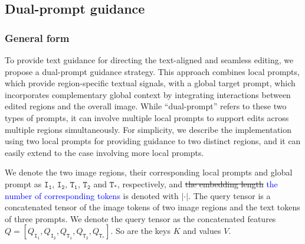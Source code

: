 \documentclass{article}
\newcommand{\kc}[1]{\textcolor{blue}{#1}}
\begin{document}


\subsection{Dual-prompt guidance}
\label{sec:dualprompt}

\subsubsection{General form}
To provide text guidance for directing the text-aligned and seamless editing, we propose a dual-prompt guidance strategy. This approach combines local prompts, which provide region-specific textual signals, with a global target prompt, which incorporates complementary global context by integrating interactions between edited regions and the overall image. While ``dual-prompt'' refers to these two types of prompts, it can involve multiple local prompts to support edits across multiple regions simultaneously. For simplicity, we describe the implementation using two local prompts for providing guidance to two distinct regions, and it can easily extend to the case involving more local prompts.

We denote the two image regions, their corresponding local prompts and global prompt  as $\texttt{I}_\texttt{1}$,  $\texttt{I}_\texttt{2}$,  $\texttt{T}_\texttt{1}$, $\texttt{T}_\texttt{2}$ and $\texttt{T}_\texttt{*}$, respectively, and \sout{the embedding length} \kc{the number of corresponding tokens} is denoted with $|\cdot|$. The query tensor is a concatenated tensor of the image tokens of two image regions and the text tokens of three prompts. We denote the query tensor as the concatenated features $ Q= [Q_{\texttt{I}_\texttt{1}}, Q_{\texttt{I}_\texttt{2}}, Q_{\texttt{T}_\texttt{1}}, Q_{\texttt{T}_\texttt{2}}, Q_{\texttt{T}_\texttt{*}}]$. So are the keys $K$ and values $V$. 
\end{document}
